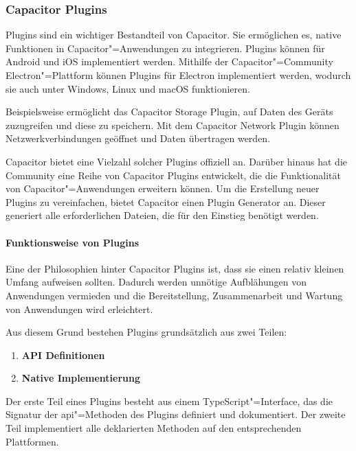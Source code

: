 \subsubsection{Capacitor Plugins}

Plugins sind ein wichtiger Bestandteil von Capacitor.
Sie ermöglichen es, native Funktionen in Capacitor"=Anwendungen zu integrieren.
Plugins können für Android und iOS implementiert werden.
Mithilfe der Capacitor"=Community Electron"=Plattform können Plugins für Electron implementiert werden, wodurch sie auch unter Windows, Linux und macOS funktionieren.
\cite{capacitor:docs, capacitor-electron}

Beispielsweise ermöglicht das Capacitor Storage Plugin, auf Daten des Geräts zuzugreifen und diese zu speichern.
Mit dem Capacitor Network Plugin können Netzwerkverbindungen geöffnet und Daten übertragen werden.
\cite{capacitor:plugins}

Capacitor bietet eine Vielzahl solcher Plugins offiziell an.
Darüber hinaus hat die Community eine Reihe von Capacitor Plugins entwickelt, die die Funktionalität von Capacitor"=Anwendungen erweitern können.
Um die Erstellung neuer Plugins zu vereinfachen, bietet Capacitor einen Plugin Generator an.
Dieser generiert alle erforderlichen Dateien, die für den Einstieg benötigt werden.
\cite{capacitor:docs}

\newpage

\paragraph{Funktionsweise von Plugins}

Eine der Philosophien hinter Capacitor Plugins ist, dass sie einen relativ kleinen Umfang aufweisen sollten.
Dadurch werden unnötige Aufblähungen von Anwendungen vermieden und die Bereitstellung, Zusammenarbeit und Wartung von Anwendungen wird erleichtert.
\cite{capacitor:docs}

Aus diesem Grund bestehen Plugins grundsätzlich aus zwei Teilen:

\begin{enumerate}
  \setlength\itemsep{-0.8em}
  \item \textbf{API Definitionen} 
  \item \textbf{Native Implementierung}
\end{enumerate}

Der erste Teil eines Plugins besteht aus einem TypeScript"=Interface, das die Signatur der \acs{api}"=Methoden des Plugins definiert und dokumentiert.
Der zweite Teil implementiert alle deklarierten Methoden auf den entsprechenden Plattformen.
\cite{capacitor:docs}

